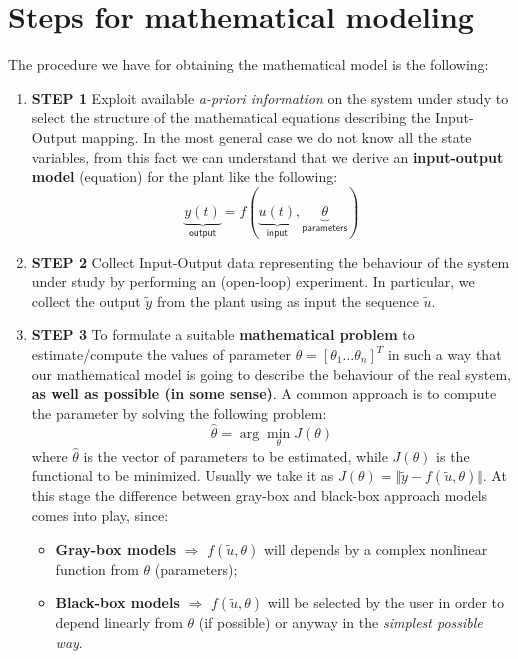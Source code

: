 \section{Steps for mathematical modeling}
The procedure we have for obtaining the mathematical model  is the following:
\begin{enumerate}
    \item \textsf{\textbf{STEP 1}} Exploit available \textit{a-priori information} on the system under study to select the structure of the mathematical equations describing the Input-Output mapping. In the most general case we do not know all the state variables, from this fact we can understand that we derive an \textbf{input-output model} (equation) for the plant like the following:
    \begin{equation}
        \underbrace{y(t)}_{\textsf{output}}=
        f( \underbrace{u(t)}_{\textsf{input}}, \underbrace{\theta}_{\textsf{parameters}})
    \end{equation}
    \item \textsf{\textbf{STEP 2}} Collect Input-Output data representing the behaviour of the system under study by performing an (open-loop) experiment. In particular, we collect the output $\tilde{y}$ from the plant using as input the sequence $\tilde{u}$.
    \item \textsf{\textbf{STEP 3}} To formulate a suitable \textbf{mathematical problem} to estimate/compute the values of parameter $\theta=[\theta_1...\theta_n]^T$ in such a way that our mathematical model is going to describe the behaviour of the real system, \textbf{as well as possible (in some sense)}. A common approach is to compute the parameter by solving the following problem:
    \begin{equation}
        \hat{\theta} = \arg\min_{\theta}{J(\theta)}
    \end{equation}
    where $\hat{\theta}$ is the vector of parameters to be estimated, while $J(\theta)$ is the functional to be minimized. Usually we take it as $J(\theta)=\Vert \tilde{y}-f(\tilde{u}, \theta)\Vert$.
    At this stage the difference between gray-box and black-box approach models comes into play, since:
    \begin{itemize}
        \item \textbf{Gray-box models} $\Longrightarrow$ $f(\tilde{u}, \theta)$ will depends by a complex nonlinear function from $\theta$ (parameters); 
        \item \textbf{Black-box models} $\Longrightarrow$ $f(\tilde{u}, \theta)$ will be selected by the user in order to depend linearly from $\theta$ (if possible) or anyway in the \textit{simplest possible way}.
    \end{itemize}
\end{enumerate}
